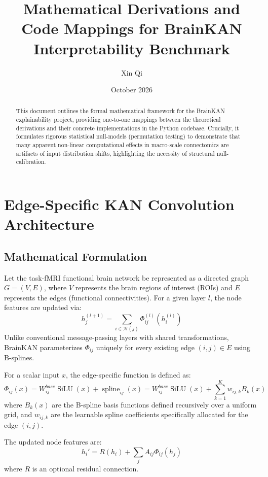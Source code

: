 \documentclass{article}
\title{Mathematical Derivations and Code Mappings for BrainKAN Interpretability Benchmark}
\author{Xin Qi}
\date{October 2026}
\begin{document}
\maketitle

\begin{abstract}
This document outlines the formal mathematical framework for the BrainKAN explainability project, providing one-to-one mappings between the theoretical derivations and their concrete implementations in the Python codebase. Crucially, it formulates rigorous statistical null-models (permutation testing) to demonstrate that many apparent non-linear computational effects in macro-scale connectomics are artifacts of input distribution shifts, highlighting the necessity of structural null-calibration.
\end{abstract}

\section{Edge-Specific KAN Convolution Architecture}
\subsection{Mathematical Formulation}
Let the task-fMRI functional brain network be represented as a directed graph $G = (V, E)$, where $V$ represents the brain regions of interest (ROIs) and $E$ represents the edges (functional connectivities). For a given layer $l$, the node features are updated via:
\begin{equation}
h_j^{(l+1)} = \sum_{i \in \mathcal{N}(j)} \Phi_{ij}^{(l)}\left(h_i^{(l)}\right)
\end{equation}
Unlike conventional message-passing layers with shared transformations, BrainKAN parameterizes $\Phi_{ij}$ uniquely for every existing edge $(i,j) \in E$ using B-splines. 

For a scalar input $x$, the edge-specific function is defined as:
\begin{equation}
\Phi_{ij}(x) = W^{base}_{ij}\operatorname{SiLU}(x) + \operatorname{spline}_{ij}(x) = W^{base}_{ij} \operatorname{SiLU}(x) + \sum_{k=1}^K w_{ij,k} B_k(x)
\end{equation}
where $B_k(x)$ are the B-spline basis functions defined recursively over a uniform grid, and $w_{ij,k}$ are the learnable spline coefficients specifically allocated for the edge $(i, j)$.

The updated node features are:
\begin{equation}
h_i' = R(h_i) + \sum_{j} A_{ij}\Phi_{ij}(h_j)
\end{equation}
where $R$ is an optional residual connection.
\end{document}
